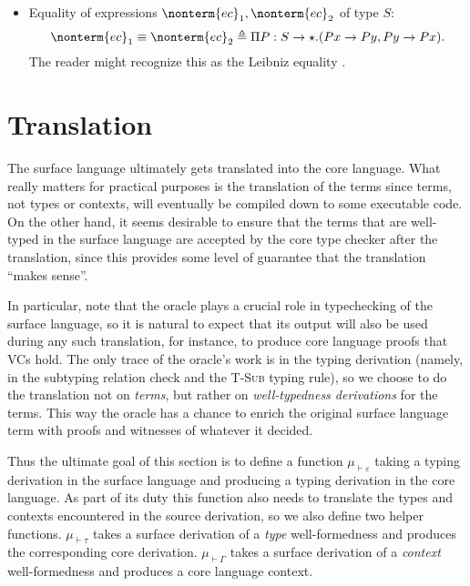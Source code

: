 \documentclass[a4paper]{article}
\newtheorem{lemma}{Lemma}
\begin{document}
\begin{itemize}
\[    \]
    As a direct consequence of the previous lemma we obtain
    \begin{lemma}\label{lma:non_dep_pair_typing}
      If $\nonterm{tc}_1, \nonterm{tc}_2$ are well-formed in $\nonterm{GC}$,
      then $(\nonterm{tc}_1, \nonterm{tc}_2)$ is well-formed in $\nonterm{GC}$ and has type $\star$.
    \end{lemma}
  \item Equality of expressions $\nonterm{ec}_1, \nonterm{ec}_2$ of type $S$:
    \[
      \nonterm{ec}_1 \equiv \nonterm{ec}_2 \triangleq \Pi P : S \rightarrow \star. (P x \rightarrow P y, P y \rightarrow P x).
    \]
    The reader might recognize this as the Leibniz equality \cite{FindSomethingForThis}.
\end{itemize}

\section{Translation}

\newcommand{\tranty}{\mu_\tau}
\newcommand{\tranterm}{\mu_\varepsilon}

\newcommand{\Tranctx}{\mu_{\vdash\Gamma}}
\newcommand{\Tranty}{\mu_{\vdash\tau}}
\newcommand{\Tranterm}{\mu_{\vdash\varepsilon}}

The surface language ultimately gets translated into the core language.
What really matters for practical purposes is the translation of the terms since
terms, not types or contexts, will eventually be compiled down to some executable code.
On the other hand, it seems desirable to ensure that the terms
that are well-typed in the surface language
are accepted by the core type checker after the translation,
since this provides some level of guarantee that the translation ``makes sense''.

In particular, note that the oracle plays a crucial role in typechecking of the surface language,
so it is natural to expect that its output will also be used during any such translation,
for instance, to produce core language proofs that VCs hold.
The only trace of the oracle's work is in the typing derivation
(namely, in the subtyping relation check and the \textsc{T-Sub} typing rule),
so we choose to do the translation not on \emph{terms},
but rather on \emph{well-typedness derivations} for the terms.
This way the oracle has a chance to enrich the original surface language term
with proofs and witnesses of whatever it decided.

Thus the ultimate goal of this section is to define a function $\Tranterm$
taking a typing derivation in the surface language
and producing a typing derivation in the core language.
As part of its duty
this function also needs to translate the types and contexts
encountered in the source derivation,
so we also define two helper functions.
$\Tranty$ takes a surface derivation of a \emph{type} well-formedness
and produces the corresponding core derivation.
$\Tranctx$ takes a surface derivation of a \emph{context} well-formedness
and produces a core language context.
\end{document}
